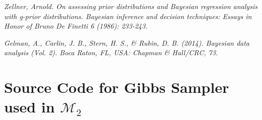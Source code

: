 \documentclass{../../tex_template/asaproc}
\newcommand{\M}{\mathcal{M}}
\begin{document}
\begin{references}
{\footnotesize
\itemsep=3pt
\item {\em Zellner, Arnold. On assessing prior distributions and Bayesian regression analysis with g-prior distributions. Bayesian inference and decision techniques: Essays in Honor of Bruno De Finetti 6 (1986): 233-243.}
\item {\em Gelman, A., Carlin, J. B., Stern, H. S., \& Rubin, D. B. (2014). Bayesian data analysis (Vol. 2). Boca Raton, FL, USA: Chapman \& Hall/CRC, 73.}
}
\end{references}

\newpage
\section{Source Code for Gibbs Sampler used in $\M_2$}

\end{document}

